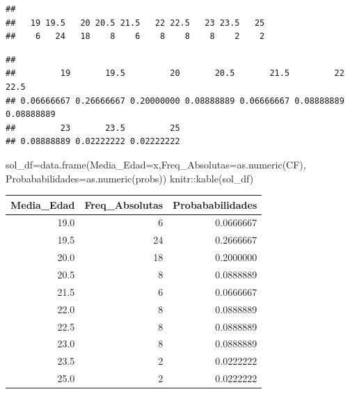 \documentclass[
]{article}
\newenvironment{Shaded}{\begin{snugshade}}{\end{snugshade}}
\newcommand{\AttributeTok}[1]{\textcolor[rgb]{0.77,0.63,0.00}{#1}}
\newcommand{\FunctionTok}[1]{\textcolor[rgb]{0.00,0.00,0.00}{#1}}
\newcommand{\NormalTok}[1]{#1}
\newcommand{\OtherTok}[1]{\textcolor[rgb]{0.56,0.35,0.01}{#1}}
\newcommand{\SpecialCharTok}[1]{\textcolor[rgb]{0.00,0.00,0.00}{#1}}
\begin{document}
\begin{Shaded}
\end{Shaded}

\begin{verbatim}
## 
##   19 19.5   20 20.5 21.5   22 22.5   23 23.5   25 
##    6   24   18    8    6    8    8    8    2    2
\end{verbatim}

\begin{Shaded}
\end{Shaded}

\begin{verbatim}
## 
##         19       19.5         20       20.5       21.5         22       22.5 
## 0.06666667 0.26666667 0.20000000 0.08888889 0.06666667 0.08888889 0.08888889 
##         23       23.5         25 
## 0.08888889 0.02222222 0.02222222
\end{verbatim}

\begin{Shaded}
\begin{Highlighting}[]
\NormalTok{sol\_df}\OtherTok{=}\FunctionTok{data.frame}\NormalTok{(}\AttributeTok{Media\_Edad=}\NormalTok{x,}\AttributeTok{Freq\_Absolutas=}\FunctionTok{as.numeric}\NormalTok{(CF),}
                  \AttributeTok{Probababilidades=}\FunctionTok{as.numeric}\NormalTok{(probs))}
\NormalTok{knitr}\SpecialCharTok{::}\FunctionTok{kable}\NormalTok{(sol\_df)}
\end{Highlighting}
\end{Shaded}

\begin{longtable}[]{@{}rrr@{}}
\toprule()
Media\_Edad & Freq\_Absolutas & Probababilidades \\
\midrule()
\endhead
19.0 & 6 & 0.0666667 \\
19.5 & 24 & 0.2666667 \\
20.0 & 18 & 0.2000000 \\
20.5 & 8 & 0.0888889 \\
21.5 & 6 & 0.0666667 \\
22.0 & 8 & 0.0888889 \\
22.5 & 8 & 0.0888889 \\
23.0 & 8 & 0.0888889 \\
23.5 & 2 & 0.0222222 \\
25.0 & 2 & 0.0222222 \\
\bottomrule()
\end{longtable}
\end{document}
